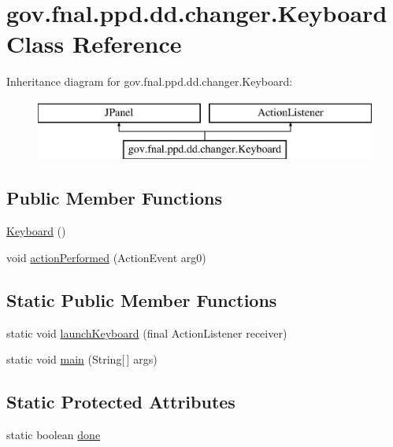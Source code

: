 \hypertarget{classgov_1_1fnal_1_1ppd_1_1dd_1_1changer_1_1Keyboard}{\section{gov.\-fnal.\-ppd.\-dd.\-changer.\-Keyboard Class Reference}
\label{classgov_1_1fnal_1_1ppd_1_1dd_1_1changer_1_1Keyboard}
}
Inheritance diagram for gov.\-fnal.\-ppd.\-dd.\-changer.\-Keyboard\-:\begin{figure}[H]
\begin{center}
\leavevmode
\includegraphics[height=2.000000cm]{classgov_1_1fnal_1_1ppd_1_1dd_1_1changer_1_1Keyboard}
\end{center}
\end{figure}
\subsection*{Public Member Functions}
\begin{DoxyCompactItemize}
\item 
\hyperlink{classgov_1_1fnal_1_1ppd_1_1dd_1_1changer_1_1Keyboard_a378d8ad1737a0b589179cf8837802646}{Keyboard} ()
\item 
void \hyperlink{classgov_1_1fnal_1_1ppd_1_1dd_1_1changer_1_1Keyboard_ae82dcddbca1c0f14f83ef8b816f16b98}{action\-Performed} (Action\-Event arg0)
\end{DoxyCompactItemize}
\subsection*{Static Public Member Functions}
\begin{DoxyCompactItemize}
\item 
static void \hyperlink{classgov_1_1fnal_1_1ppd_1_1dd_1_1changer_1_1Keyboard_a9ef174a32898d02d78fcac8c470bef4e}{launch\-Keyboard} (final Action\-Listener receiver)
\item 
static void \hyperlink{classgov_1_1fnal_1_1ppd_1_1dd_1_1changer_1_1Keyboard_aaa6706c062c5942f7bb8e990b92f43b5}{main} (String\mbox{[}$\,$\mbox{]} args)
\end{DoxyCompactItemize}
\subsection*{Static Protected Attributes}
\begin{DoxyCompactItemize}
\item 
static boolean \hyperlink{classgov_1_1fnal_1_1ppd_1_1dd_1_1changer_1_1Keyboard_a6f230d170cc944f67dade92fa52cfee7}{done}
\end{DoxyCompactItemize}


